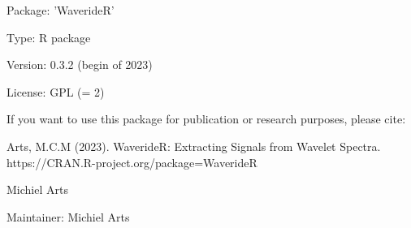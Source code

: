 \documentclass[a4paper]{book}
\begin{document}
%
\begin{Details}
Package: 'WaverideR'

Type: R package

Version: 0.3.2 (begin of 2023)

License: GPL (= 2)
\end{Details}
%
\begin{Note}
If you want to use this package for publication or research
purposes, please cite:

Arts, M.C.M (2023).
WaverideR: Extracting Signals from Wavelet Spectra.
https://CRAN.R-project.org/package=WaverideR
\end{Note}
%
\begin{Author}
Michiel Arts

Maintainer: Michiel Arts 
\end{Author}
%
\end{document}

